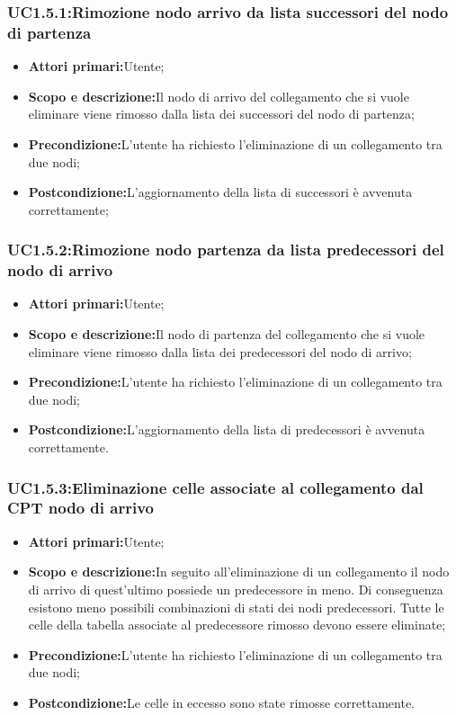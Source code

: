 \subsubsection{UC1.5.1:Rimozione nodo arrivo da lista successori del nodo di partenza}
\begin{itemize}
	\item{\textbf{Attori primari:}Utente;}
	\item{\textbf{Scopo e descrizione:}Il nodo di arrivo del collegamento che si vuole eliminare viene rimosso dalla lista dei successori del nodo di partenza;}
	\item{\textbf{Precondizione:}L'utente ha richiesto l'eliminazione di un collegamento tra due nodi;}
	\item{\textbf{Postcondizione:}L'aggiornamento della lista di successori è avvenuta correttamente;}
\end{itemize}
\subsubsection{UC1.5.2:Rimozione nodo partenza da lista predecessori del nodo di arrivo}
\begin{itemize}
	\item{\textbf{Attori primari:}Utente;}
	\item{\textbf{Scopo e descrizione:}Il nodo di partenza del collegamento che si vuole eliminare viene rimosso dalla lista dei predecessori del nodo di arrivo;}
	\item{\textbf{Precondizione:}L'utente ha richiesto l'eliminazione di un collegamento tra due nodi;}
	\item{\textbf{Postcondizione:}L'aggiornamento della lista di predecessori è avvenuta correttamente.}
\end{itemize}
\subsubsection{UC1.5.3:Eliminazione celle associate al collegamento dal CPT nodo di arrivo}
\begin{itemize}
	\item{\textbf{Attori primari:}Utente;}
	\item{\textbf{Scopo e descrizione:}In seguito all'eliminazione di un collegamento il nodo di arrivo di quest'ultimo possiede un predecessore in meno. Di conseguenza esistono meno possibili combinazioni di stati dei nodi predecessori. Tutte le celle della tabella associate al predecessore rimosso devono essere eliminate;}
	\item{\textbf{Precondizione:}L'utente ha richiesto l'eliminazione di un collegamento tra due nodi;}
	\item{\textbf{Postcondizione:}Le celle in eccesso sono state rimosse correttamente.}
\end{itemize}
